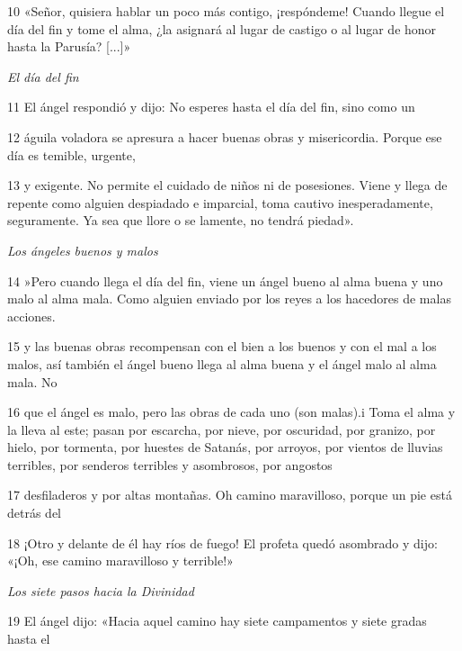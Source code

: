 \par 10 «Señor, quisiera hablar un poco más contigo, ¡respóndeme! Cuando llegue el día del fin y tome el alma, ¿la asignará al lugar de castigo o al lugar de honor hasta la Parusía? [...]»

\par \textit{El día del fin}

\par 11 El ángel respondió y dijo: No esperes hasta el día del fin, sino como un

\par 12 águila voladora se apresura a hacer buenas obras y misericordia. Porque ese día es temible, urgente,

\par 13 y exigente. No permite el cuidado de niños ni de posesiones. Viene y llega de repente como alguien despiadado e imparcial, toma cautivo inesperadamente, seguramente. Ya sea que llore o se lamente, no tendrá piedad».

\par \textit{Los ángeles buenos y malos}

\par 14 »Pero cuando llega el día del fin, viene un ángel bueno al alma buena y uno malo al alma mala. Como alguien enviado por los reyes a los hacedores de malas acciones.

\par 15 y las buenas obras recompensan con el bien a los buenos y con el mal a los malos, así también el ángel bueno llega al alma buena y el ángel malo al alma mala. No

\par 16 que el ángel es malo, pero las obras de cada uno (son malas).i Toma el alma y la lleva al este; pasan por escarcha, por nieve, por oscuridad, por granizo, por hielo, por tormenta, por huestes de Satanás, por arroyos, por vientos de lluvias terribles, por senderos terribles y asombrosos, por angostos

\par 17 desfiladeros y por altas montañas. Oh camino maravilloso, porque un pie está detrás del

\par 18 ¡Otro y delante de él hay ríos de fuego! El profeta quedó asombrado y dijo: «¡Oh, ese camino maravilloso y terrible!»

\par \textit{Los siete pasos hacia la Divinidad}

\par 19 El ángel dijo: «Hacia aquel camino hay siete campamentos y siete gradas hasta el

